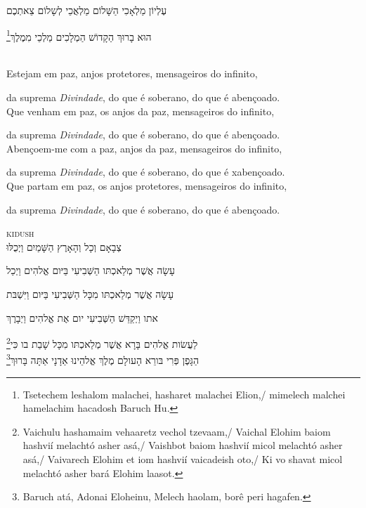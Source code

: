 עֶלְיוֹן מַלְאָכִי הַשָּׁלוֹם מַלְאֲכֵי לְשָלוֹם צֵאתְכֶם 

הוּא בָרוּךְ הַקָדוֹשׁ הַמְלָכִים מַלְכֵי מִמֶלֶךְ\footnote{Tsetechem leshalom malachei, hasharet malachei Elion,/
mimelech malchei hamelachim hacadosh Baruch Hu.} 

\movetooddpage
\raggedright

\textsc{}\\[15pt]

Estejam em paz, anjos protetores, mensageiros do infinito,

da suprema \emph{Divindade},  do que é soberano, do que é abençoado.\\[10pt]

Que venham em paz, os anjos da paz, mensageiros do infinito,

da suprema \emph{Divindade}, do que é soberano, do que é abençoado.\\[10pt]

Abençoem-me com a paz, anjos da paz, mensageiros do infinito,

da suprema \emph{Divindade}, do que é soberano, do que é xabençoado.\\[10pt]

Que partam em paz, os anjos protetores, mensageiros do infinito,

da suprema \emph{Divindade}, do que é soberano, do que é abençoado.

\movetoevenpage
\raggedleft

\textsc{kidush}\\[15pt]

צְבָאָם וְכָל וְהָאָרֶץ הַשָּׁמַיִם וַיְכֻלּוּ 

עָשָׂה אֲשֶׁר מְלַאכְתּו הַשְּׁבִיעִי בַּיּום אֱלהִים וַיְכַל 

עָשָׂה אֲשֶׁר מְלַאכְתּו מִכָּל הַשְּׁבִיעִי בַּיּום וַיִּשְׁבּת 

אתו וַיְקַדֵּשׁ הַשְּׁבִיעִי יום אֶת אֱלהִים וַיְבָרֶךְ 

לַעֲשׂות אֱלהִים בָּרָא אֲשֶׁר מְלַאכְתּו מִכָּל שָׁבַת בו כִּי\footnote{Vaichulu hashamaim vehaaretz vechol tzevaam,/
Vaichal Elohim baiom hashvií melachtó asher asá,/
Vaishbot baiom hashvií micol melachtó asher asá,/
Vaivarech Elohim et iom hashvií vaicadeish oto,/
Ki vo shavat micol melachtó asher bará Elohim laasot.}\\[10pt] 

הַגָּפֶן פְּרִי בּורֵא הָעולָם מֶלֶךְ אֱלהֵינוּ אַדָנָי אַתָּה בָּרוּךְ\footnote{Baruch atá, Adonai Eloheinu, Melech haolam, borê peri hagafen.}\\[10pt] 

